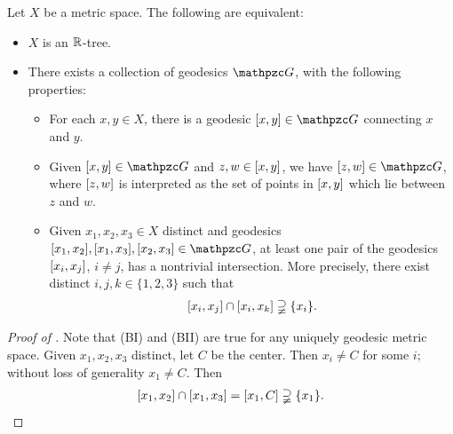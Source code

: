\begin{lemma}
\label{lemmaRtreeequivalent}
Let $X$ be a metric space. The following are equivalent:
\begin{itemize}
\item[(A)] $X$ is an $\R$-tree.
\item[(B)] There exists a collection of geodesics $\GG$, with the following properties:
\begin{itemize}
\item[(BI)] For each $x,y\in X$, there is a geodesic $\geo xy\in\GG$ connecting $x$ and $y$.
\item[(BII)] Given $\geo xy\in\GG$ and $z,w\in [x,y]$, we have $\geo zw\in\GG$, where $[z,w]$ is interpreted as the set of points in $[x,y]$ which lie between $z$ and $w$.
\item[(BIII)] Given $x_1,x_2,x_3\in X$ distinct and geodesics $\geo{x_1}{x_2},\geo{x_1}{x_3},\geo{x_2}{x_3}\in\GG$, at least one pair of the geodesics $[x_i,x_j]$, $i\neq j$, has a nontrivial intersection. More precisely, there exist distinct $i,j,k\in\{1,2,3\}$ such that
\[
[x_i,x_j] \cap [x_i,x_k] \supsetneqq \{x_i\}.
\]
\end{itemize}
\end{itemize}
\end{lemma}
\begin{proof}[Proof of  \implies {}]
Note that (BI) and (BII) are true for any uniquely geodesic metric space. Given $x_1,x_2,x_3$ distinct, let $C$ be the center. Then $x_i\neq C$ for some $i$; without loss of generality $x_1\neq C$. Then
\[
[x_1,x_2] \cap [x_1,x_3] = [x_1,C] \supsetneqq \{x_1\}.
\]
\end{proof}
